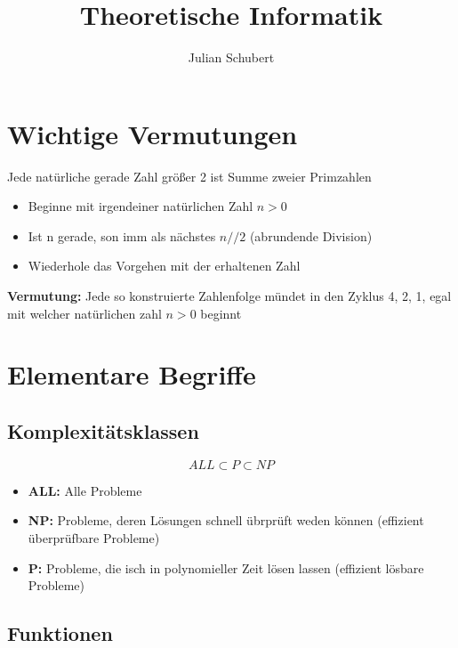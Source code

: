 \documentclass[14pt]{article}
\title{Theoretische Informatik}
\author{Julian Schubert}
\begin{document}
    \maketitle
    \tableofcontents

    \newpage

    \section{Wichtige Vermutungen}
    \begin{definition}
        Jede natürliche gerade Zahl größer 2 ist Summe zweier Primzahlen
    \end{definition}
    \begin{definition}
        \begin{itemize}
            \item Beginne mit irgendeiner natürlichen Zahl $n > 0$
            \item Ist n gerade, son imm als nächstes $n // 2$ (abrundende Division)
            \item Wiederhole das Vorgehen mit der erhaltenen Zahl
        \end{itemize}
        \noindent
        \textbf{Vermutung:} Jede so konstruierte Zahlenfolge mündet in den Zyklus
            4, 2, 1, egal mit welcher natürlichen zahl $n > 0$ beginnt
    \end{definition}
    
    \section{Elementare Begriffe}
        \subsection{Komplexitätsklassen}
        \[
            ALL \subset P \subset NP
        \]
        \begin{itemize}
            \item \textbf{ALL:} Alle Probleme
            \item \textbf{NP:} Probleme, deren Lösungen schnell übrprüft weden können
                (effizient überprüfbare Probleme)
            \item \textbf{P:} Probleme, die isch in polynomieller Zeit lösen lassen 
                (effizient lösbare Probleme)
        \end{itemize}
        \subsection{Funktionen}
\end{document}
